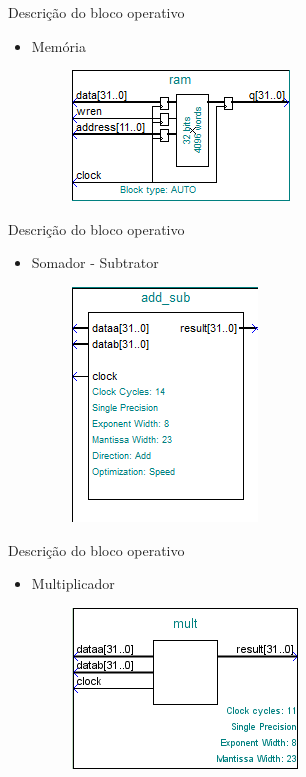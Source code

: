 \documentclass[11pt]{beamer}
\begin{document}
\begin{frame}{Descrição do bloco operativo}
	\begin{itemize}
	\item Memória
	\begin{figure}[ht]
	\centering
	\includegraphics[width=.5\textwidth]{ram}
	\label{fig:ram}
	\end{figure}
	\end{itemize}
\end{frame}

\begin{frame}{Descrição do bloco operativo}
	\begin{itemize}
	\item Somador - Subtrator
	\begin{figure}[ht]
	\centering
	\includegraphics[width=.5\textwidth]{add_sub}
	\label{fig:add_sub}
	\end{figure}
	\end{itemize}
\end{frame}

\begin{frame}{Descrição do bloco operativo}
	\begin{itemize}
	\item Multiplicador
	\begin{figure}[ht]
	\centering
	\includegraphics[width=.5\textwidth]{mult}
	\label{fig:mult}
	\end{figure}
	\end{itemize}
\end{frame}
\end{document}
